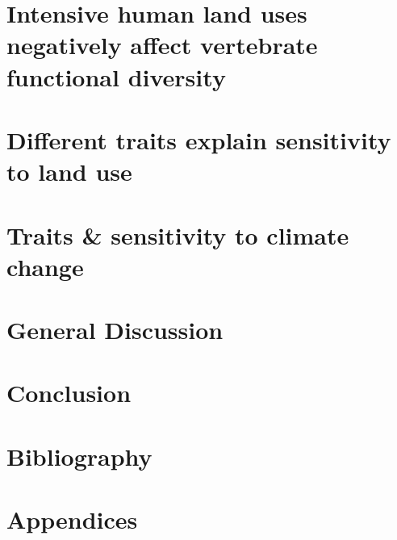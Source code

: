 \documentclass[11pt]{report}
\renewcommand{\baselinestretch}{1.5}
\begin{document}


\chapter{Intensive human land uses negatively affect vertebrate functional diversity}


\chapter{Different traits explain sensitivity to land use}
%

\chapter{Traits \& sensitivity to climate change}
%

\chapter{General Discussion}

\chapter{Conclusion}


\clearpage
{}
\chapter*{Bibliography}
\renewcommand{\baselinestretch}{1}
\printbibliography[heading=none]



\renewcommand{\baselinestretch}{1.15}


\clearpage

\chapter*{Appendices}
\clearpage

\end{document}

